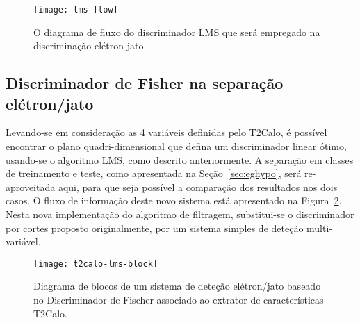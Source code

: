 \begin{figure}
\begin{center}
\texttt{[image: lms-flow]}
\end{center}
\caption{O diagrama de fluxo do discriminador LMS que será empregado na
discriminação elétron-jato.}
\label{fig:lms-flow}
\end{figure}

\subsection{Discriminador de Fisher na separação e\-lé\-tron/jato}
\label{sec:lms-ej}

Levando-se em consideração as 4 variáveis definidas pelo T2Calo, é possível
encontrar o plano quadri-dimensional que defina um discriminador linear ótimo,
usando-se o algoritmo LMS, como descrito anteriormente. A separação em classes
de treinamento e teste, como apresentada na Seção~\ref{sec:eghypo}, será
re-aproveitada aqui, para que seja possível a comparação dos resultados nos
dois casos. O fluxo de informação deste novo sistema está apresentado na
Figura~\ref{fig:t2calo-lms-block}. Nesta nova implementação do algoritmo de
filtragem, substitui-se o discriminador por cortes proposto originalmente, por
um sistema simples de deteção multi-variável.

\begin{figure}
\begin{center}
\texttt{[image: t2calo-lms-block]}
\end{center}
\caption{Diagrama de blocos de um sistema de deteção elétron/jato baseado no
Discriminador de Fischer associado ao extrator de características T2Calo.}
\label{fig:t2calo-lms-block}
\end{figure}

